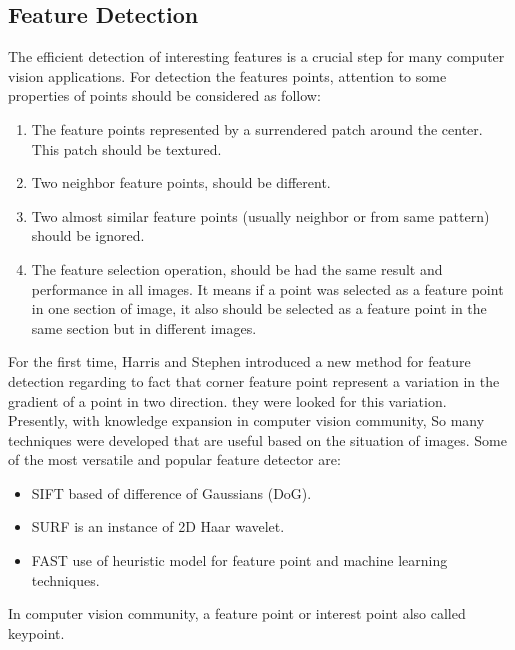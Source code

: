 \subsection{Feature Detection}
 The efficient detection of interesting features is a crucial step for many computer vision applications. For detection the features points, attention to some properties of points should be considered as follow: \cite{forstner1986feature}
\begin{enumerate}
  \item The feature points represented by a surrendered patch around the center. This patch should be textured.
  \item Two neighbor feature points, should be different.
  \item Two almost similar feature points (usually neighbor or from same pattern) should be ignored.
  \item The feature selection operation, should be had the same result and performance in all images. It means if a point was selected as a feature point in one section of image, it also should be selected as a feature point in the same section but in different images.
\end{enumerate}
For the first time, Harris and Stephen \cite{harris1988combined} introduced a new method for feature detection regarding to fact that corner feature point represent a variation in the gradient of a point in two direction. they were looked for this variation.\\
Presently, with knowledge expansion in computer vision community, So many techniques were developed that are useful based on the situation of images. Some of the most versatile and popular feature detector are:
\begin{itemize}
\item SIFT \cite{lowe2004distinctive} based of difference of Gaussians (DoG).
\item SURF \cite{bay2006surf} is an instance of 2D Haar wavelet.
\item FAST \cite{rosten2010faster} use of heuristic model for feature point and machine learning techniques.
\end{itemize}
In computer vision community, a feature point or interest point also called keypoint.

